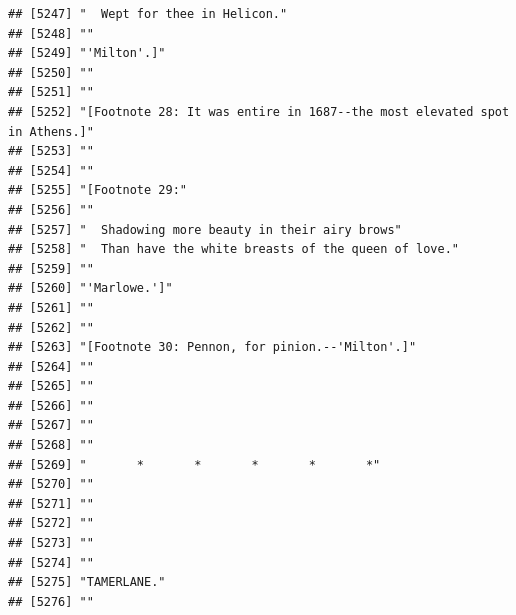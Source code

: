 \documentclass{article}\usepackage[]{graphicx}\usepackage[]{color}
\makeatletter
\newenvironment{kframe}{%
 \def\at@end@of@kframe{}%
 \ifinner\ifhmode%
  \def\at@end@of@kframe{\end{minipage}}%
  \begin{minipage}{\columnwidth}%
 \fi\fi%
 \def\FrameCommand##1{\hskip\@totalleftmargin \hskip-\fboxsep
 \colorbox{shadecolor}{##1}\hskip-\fboxsep
     \hskip-\linewidth \hskip-\@totalleftmargin \hskip\columnwidth}%
 \MakeFramed {\advance\hsize-\width
   \@totalleftmargin\z@ \linewidth\hsize
   \@setminipage}}%
 {\par\unskip\endMakeFramed%
 \at@end@of@kframe}
\newenvironment{knitrout}{}{} %
\makeatother
\begin{document}
\begin{knitrout}
\begin{kframe}
\begin{verbatim}
## [5247] "  Wept for thee in Helicon."                                                 
## [5248] ""                                                                            
## [5249] "'Milton'.]"                                                                  
## [5250] ""                                                                            
## [5251] ""                                                                            
## [5252] "[Footnote 28: It was entire in 1687--the most elevated spot in Athens.]"     
## [5253] ""                                                                            
## [5254] ""                                                                            
## [5255] "[Footnote 29:"                                                               
## [5256] ""                                                                            
## [5257] "  Shadowing more beauty in their airy brows"                                 
## [5258] "  Than have the white breasts of the queen of love."                         
## [5259] ""                                                                            
## [5260] "'Marlowe.']"                                                                 
## [5261] ""                                                                            
## [5262] ""                                                                            
## [5263] "[Footnote 30: Pennon, for pinion.--'Milton'.]"                               
## [5264] ""                                                                            
## [5265] ""                                                                            
## [5266] ""                                                                            
## [5267] ""                                                                            
## [5268] ""                                                                            
## [5269] "       *       *       *       *       *"                                    
## [5270] ""                                                                            
## [5271] ""                                                                            
## [5272] ""                                                                            
## [5273] ""                                                                            
## [5274] ""                                                                            
## [5275] "TAMERLANE."                                                                  
## [5276] ""                                                                            

\end{verbatim}
\end{kframe}
\end{knitrout}
\end{document}
